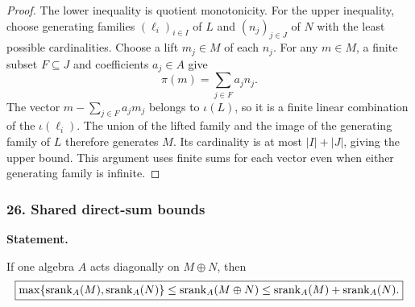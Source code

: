 \begin{proof}
The lower inequality is quotient monotonicity. For the upper inequality, choose generating families $(\ell_i)_{i\in I}$ of $L$ and $(n_j)_{j\in J}$ of $N$ with the least possible cardinalities. Choose a lift $m_j\in M$ of each $n_j$. For any $m\in M$, a finite subset $F\subseteq J$ and coefficients $a_j\in A$ give
\[
\pi(m)=\sum_{j\in F}a_jn_j.
\]
The vector $m-\sum_{j\in F}a_jm_j$ belongs to $\iota(L)$, so it is a finite linear combination of the $\iota(\ell_i)$. The union of the lifted family and the image of the generating family of $L$ therefore generates $M$. Its cardinality is at most $|I|+|J|$, giving the upper bound. This argument uses finite sums for each vector even when either generating family is infinite.
\end{proof}
\subsubsection*{26. Shared direct-sum bounds}
\label{rec:PSC-I-P-SHARED-DIRECT-SUM}
\textbf{Statement.}\par
If one algebra $A$ acts diagonally on $M\oplus N$, then
\[
\boxed{
\max\{\operatorname{srank}_A(M),\operatorname{srank}_A(N)\}
\leq\operatorname{srank}_A(M\oplus N)
\leq\operatorname{srank}_A(M)+\operatorname{srank}_A(N).
}
\]

